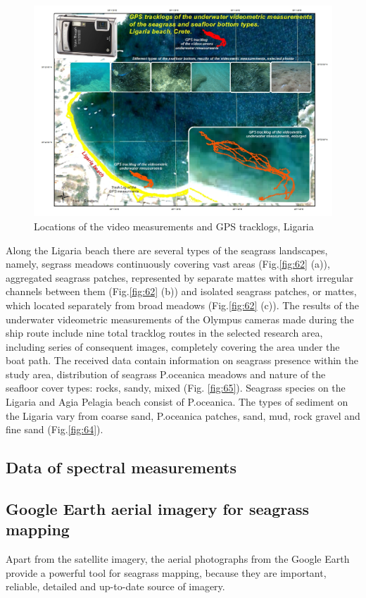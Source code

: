 \documentclass[10pt, a4paper]{article}
\begin{document}
\begin{figure}[h]
	\centering
	\includegraphics[scale=0.40]{Fig-21.jpg}
	\caption{Locations of the video measurements and GPS tracklogs, Ligaria}
	\label{fig:21}
\end{figure}

Along the Ligaria beach there are several types of the seagrass landscapes, namely, segrass meadows
continuously covering vast areas (Fig.\ref{fig:62} (a)), aggregated seagrass patches, represented by separate mattes with short irregular channels between them (Fig.\ref{fig:62} (b)) and isolated seagrass patches, or mattes,
which located separately from broad meadows (Fig.\ref{fig:62} (c)).
The results of the underwater videometric measurements of the Olympus cameras made during the
ship route include nine total tracklog routes in the selected research area, including series of
consequent images, completely covering the area under the boat path. The received data contain
information on seagrass presence within the study area, distribution of seagrass P.oceanica meadows
and nature of the seafloor cover types: rocks, sandy, mixed (Fig. \ref{fig:65}). Seagrass species on the Ligaria and Agia
Pelagia beach consist of P.oceanica. The types of sediment on the Ligaria vary from coarse sand,
P.oceanica patches, sand, mud, rock gravel and fine sand (Fig.\ref{fig:64}).

\subsection{Data of spectral measurements}

\subsection{Google Earth aerial imagery for seagrass mapping}
Apart from the satellite imagery, the aerial photographs from the Google Earth provide
a powerful tool for seagrass mapping, because they are important, reliable, detailed
and up-to-date source of imagery.
\end{document}
